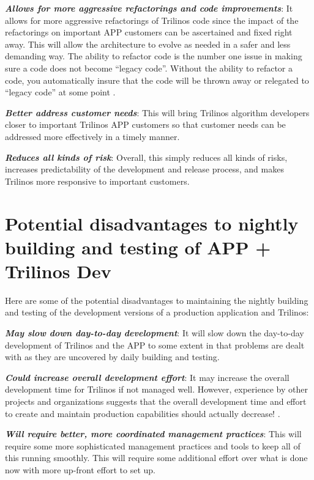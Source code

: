 \documentclass[pdf,ps2pdf,11pt]{SANDreport}
\begin{document}
{}\textit{\textbf{Allows for more aggressive refactorings and code improvements}}:
It allows for more aggressive refactorings of Trilinos code since the impact
of the refactorings on important APP customers can be ascertained and fixed
right away.  This will allow the architecture to evolve as needed in a safer
and less demanding way.  The ability to refactor code is the number one issue
in making sure a code does not become ``legacy code''.  Without the ability to
refactor a code, you automatically insure that the code will be thrown away or
relegated to ``legacy code'' at some point {}\cite{book:code-complete-2}.

{}\textit{\textbf{Better address customer needs}}: This will bring Trilinos
algorithm developers closer to important Trilinos APP customers so that
customer needs can be addressed more effectively in a timely manner.

{}\textit{\textbf{Reduces all kinds of risk}}: Overall, this simply reduces all
kinds of risks, increases predictability of the development and release
process, and makes Trilinos more responsive to important customers.


%
{}\section{Potential disadvantages to nightly building and testing of APP +
Trilinos Dev}
%

Here are some of the potential disadvantages to maintaining the nightly
building and testing of the development versions of a production application
and Trilinos:

{}\textit{\textbf{May slow down day-to-day development}}: It will slow down the
day-to-day development of Trilinos and the APP to some extent in that problems
are dealt with as they are uncovered by daily building and testing.

{}\textit{\textbf{Could increase overall development effort}}: It may increase the
overall development time for Trilinos if not managed well.  However,
experience by other projects and organizations suggests that the overall
development time and effort to create and maintain production capabilities
should actually decrease! {}\cite{book:code-complete-2}.

{}\textit{\textbf{Will require better, more coordinated management practices}}:
This will require some more sophisticated management practices and tools to
keep all of this running smoothly.  This will require some additional effort
over what is done now with more up-front effort to set up.
\end{document}

